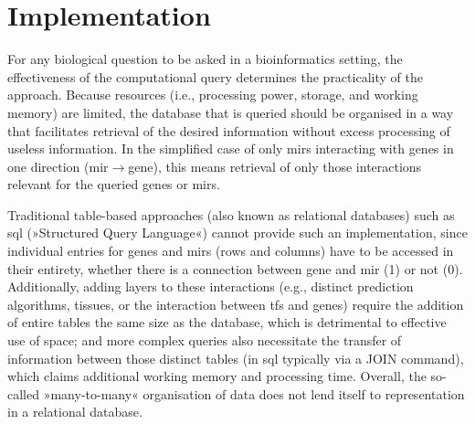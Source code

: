
\section{Implementation}
For any biological question to be asked in a bioinformatics setting, the effectiveness of the computational query determines the practicality of the approach. Because resources (i.e., processing power, storage, and working memory) are limited, the database that is queried should be organised in a way that facilitates retrieval of the desired information without excess processing of useless information. In the simplified case of only \acp{mir} interacting with genes in one direction (\ac{mir}$\to$gene), this means retrieval of only those interactions relevant for the queried genes or \acp{mir}. 

Traditional table-based approaches (also known as relational databases) such as \acs{sql}  (»Structured Query Language«) cannot provide such an implementation, since individual entries for genes and \acp{mir} (rows and columns) have to be accessed in their entirety, whether there is a connection between gene and \ac{mir} (1) or not (0). Additionally, adding layers to these interactions (e.g., distinct prediction algorithms, tissues, or the interaction between \acp{tf} and genes) require the addition of entire tables the same size as the database, which is detrimental to effective use of space; and more complex queries also necessitate the transfer of information between those distinct tables (in \ac{sql} typically via a \textcolor{dkblue}{JOIN} command), which claims additional working memory and processing time. Overall, the so-called »many-to-many« organisation of data does not lend itself to representation in a relational database. 


